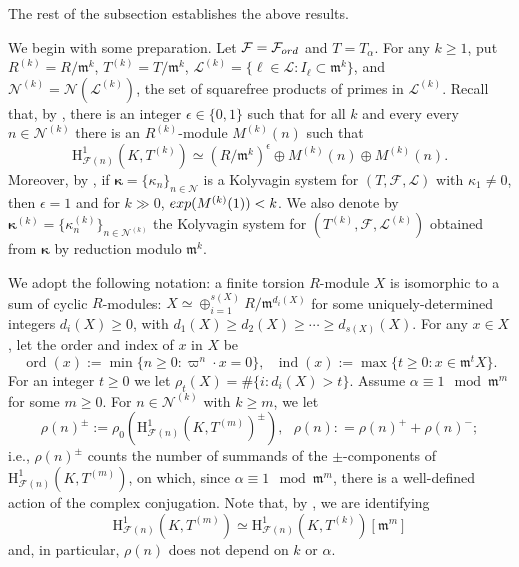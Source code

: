 \documentclass[10pt,reqno]{amsart}
\numberwithin{equation}{section}
\theoremstyle{plain}
\theoremstyle{definition}
\theoremstyle{definition}
\theoremstyle{plain}
\theoremstyle{plain}
\theoremstyle{plain}
\theoremstyle{plain}
\theoremstyle{plain}
\theoremstyle{plain}
\DeclareMathOperator{\ord}{ord}
\newcommand{\ind}{\operatorname{ind}}
\newcommand{\Z}{\mathbb{Z}}
\newcommand{\F}{\mathcal{F}}
\newcommand{\Lcal}{\mathcal{L}}
\newcommand{\CF}{\mathcal{F}}
\newcommand{\Fcal}{\mathcal{F}}
\newcommand{\cL}{\mathcal{L}}
\newcommand{\cN}{\mathcal{N}}
\newcommand{\fm}{\mathfrak{m}}
\newcommand{\rH}{\mathrm{H}}
\begin{document}
The rest of the subsection establishes the above results. 

We begin with some preparation. Let $\Fcal=\Fcal_{\rm ord}$ and $T=T_{\alpha}$. For any $k\geq 1$, put $R^{(k)}= R/\fm^k$, $T^{(k)}= T/\fm^k$, $\mathcal{L}^{(k)}=\{\ell\in \cL: I_\ell\subset \fm^k\}$, and $\mathcal{N}^{(k)}=\mathcal{N}(\cL^{(k)})$, the set of squarefree products of primes in $\cL^{(k)}$.  
Recall that, by \cite[Prop.~3.3.2]{eisenstein}, there is an integer $\epsilon\in\{0,1\}$ such that for all $k$ and every
every $n\in\cN^{(k)}$ there is an $R^{(k)}$-module $M^{(k)}(n)$ such that
\begin{equation}\label{eq:str}
\rH^1_{\CF(n)}(K,T^{(k)}) \simeq (R/\fm^k)^\epsilon\oplus M^{(k)}(n)\oplus M^{(k)}(n).
\end{equation}
Moreover, by \cite[Thm.~3.3.8]{eisenstein}, if $\boldsymbol{\kappa}=\{\kappa_n\}_{n\in\cN}$ is a Kolyvagin system for $(T,\Fcal,\mathcal{L})$ with $\kappa_1\neq 0$, then $\epsilon=1$ and for $k\gg 0$, ${\rm exp}(M^{(k)}(1))<k$. We also denote by $\boldsymbol{\kappa}^{(k)}=\{\kappa_n^{(k)}\}_{n\in\cN^{(k)}}$ the Kolyvagin system for $(T^{(k)},\Fcal,\mathcal{L}^{(k)})$ obtained from $\boldsymbol{\kappa}$ by reduction modulo $\mathfrak{m}^k$.

We adopt the following notation: a finite torsion $R$-module $X$ is isomorphic to a sum of cyclic $R$-modules:  $X \simeq \oplus_{i=1}^{s(X)} R/\fm^{d_i(X)}$ for some uniquely-determined
integers $d_i(X)\geq 0$, with $d_1(X)\geq d_2(X)\geq \cdots \geq d_{s(X)}(X)$. For any $x\in X$, let the order and index of $x$ in $X$ be
$$
\ord(x):=\min\{n\geq 0: \varpi^n\cdot x =0\}, \ \ \ \ind(x):= \max\{t\geq 0: x\in\fm^t X\}.
$$
For an integer $t\geq 0$ we let $\rho_t(X)= \# \{i: d_i(X) > t\}$. Assume $\alpha\equiv 1 \mod \fm^m$ for some $m\geq 0$. For $n\in\cN^{(k)}$ with $k\geq m$, we let
\begin{equation}\label{eq:rho0}
\rho(n)^\pm:=\rho_0(\rH^1_{\F(n)}(K, T^{(m)})^\pm), \ \ \  \rho(n): = \rho(n)^+ +\rho(n)^-;
\end{equation}
i.e., $\rho(n)^\pm$ counts the number of summands of the $\pm$-components of $\rH^1_{\F(n)}(K, T^{(m)})$, on which, since $\alpha\equiv 1 \mod \fm^m$, there is a well-defined action of the complex conjugation. Note that, by \cite[Lem. 3.3.1]{eisenstein}, we are identifying $$\rH^1_{\F(n)}(K, T^{(m)})\simeq \rH^1_{\F(n)}(K, T^{(k)})[\fm^m]$$ and, in particular, $\rho(n)$ does not depend on $k$ or $\alpha$. 
\end{document}
